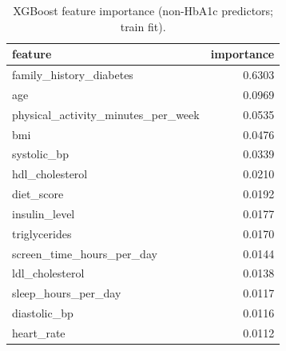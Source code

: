 \begin{table}[H]
\begin{center}
\begin{tabular}{lr}
\toprule
feature & importance \\
\midrule
family\_history\_diabetes & 0.6303 \\
age & 0.0969 \\
physical\_activity\_minutes\_per\_week & 0.0535 \\
bmi & 0.0476 \\
systolic\_bp & 0.0339 \\
hdl\_cholesterol & 0.0210 \\
diet\_score & 0.0192 \\
insulin\_level & 0.0177 \\
triglycerides & 0.0170 \\
screen\_time\_hours\_per\_day & 0.0144 \\
ldl\_cholesterol & 0.0138 \\
sleep\_hours\_per\_day & 0.0117 \\
diastolic\_bp & 0.0116 \\
heart\_rate & 0.0112 \\
\bottomrule
\end{tabular}
\end{center}
\vspace{-5pt}
\caption{XGBoost feature importance (non-HbA1c predictors; train fit).}
\label{tab:xgb_importance_non_hba1c}
\end{table}
